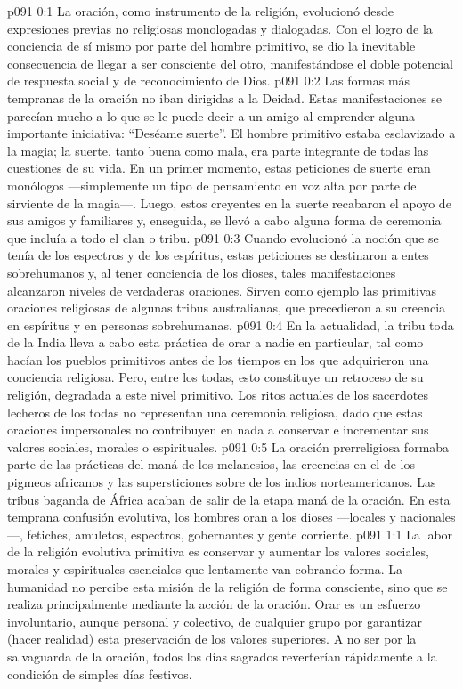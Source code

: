 \author{Jefe de los seres intermedios}
\vs p091 0:1 La oración, como instrumento de la religión, evolucionó desde expresiones previas no religiosas monologadas y dialogadas. Con el logro de la conciencia de sí mismo por parte del hombre primitivo, se dio la inevitable consecuencia de llegar a ser consciente del otro, manifestándose el doble potencial de respuesta social y de reconocimiento de Dios.
\vs p091 0:2 Las formas más tempranas de la oración no iban dirigidas a la Deidad. Estas manifestaciones se parecían mucho a lo que se le puede decir a un amigo al emprender alguna importante iniciativa: “Deséame suerte”. El hombre primitivo estaba esclavizado a la magia; la suerte, tanto buena como mala, era parte integrante de todas las cuestiones de su vida. En un primer momento, estas peticiones de suerte eran monólogos ---simplemente un tipo de pensamiento en voz alta por parte del sirviente de la magia---. Luego, estos creyentes en la suerte recabaron el apoyo de sus amigos y familiares y, enseguida, se llevó a cabo alguna forma de ceremonia que incluía a todo el clan o tribu.
\vs p091 0:3 Cuando evolucionó la noción que se tenía de los espectros y de los espíritus, estas peticiones se destinaron a entes sobrehumanos y, al tener conciencia de los dioses, tales manifestaciones alcanzaron niveles de verdaderas oraciones. Sirven como ejemplo las primitivas oraciones religiosas de algunas tribus australianas, que precedieron a su creencia en espíritus y en personas sobrehumanas.
\vs p091 0:4 En la actualidad, la tribu toda de la India lleva a cabo esta práctica de orar a nadie en particular, tal como hacían los pueblos primitivos antes de los tiempos en los que adquirieron una conciencia religiosa. Pero, entre los todas, esto constituye un retroceso de su religión, degradada a este nivel primitivo. Los ritos actuales de los sacerdotes lecheros de los todas no representan una ceremonia religiosa, dado que estas oraciones impersonales no contribuyen en nada a conservar e incrementar sus valores sociales, morales o espirituales.
\vs p091 0:5 La oración prerreligiosa formaba parte de las prácticas del maná de los melanesios, las creencias en el  de los pigmeos africanos y las supersticiones sobre  de los indios norteamericanos. Las tribus baganda de África acaban de salir de la etapa maná de la oración. En esta temprana confusión evolutiva, los hombres oran a los dioses ---locales y nacionales---, fetiches, amuletos, espectros, gobernantes y gente corriente.
\vs p091 1:1 La labor de la religión evolutiva primitiva es conservar y aumentar los valores sociales, morales y espirituales esenciales que lentamente van cobrando forma. La humanidad no percibe esta misión de la religión de forma consciente, sino que se realiza principalmente mediante la acción de la oración. Orar es un esfuerzo involuntario, aunque personal y colectivo, de cualquier grupo por garantizar (hacer realidad) esta preservación de los valores superiores. A no ser por la salvaguarda de la oración, todos los días sagrados reverterían rápidamente a la condición de simples días festivos.
